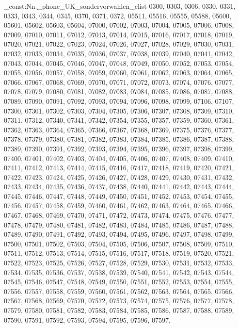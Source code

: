 \clist_const:Nn \c_phone_UK_sondervorwahlen_clist {0300,
0303,
0306,
0330,
0331,
0333,
0343,
0344,
0345,
0370,
0371,
0372,
05511,
05516,
05555,
05588,
05600,
05601,
05602,
05603,
05604,
07000,
07002,
07003,
07004,
07005,
07006,
07008,
07009,
07010,
07011,
07012,
07013,
07014,
07015,
07016,
07017,
07018,
07019,
07020,
07021,
07022,
07023,
07024,
07026,
07027,
07028,
07029,
07030,
07031,
07032,
07033,
07034,
07035,
07036,
07037,
07038,
07039,
07040,
07041,
07042,
07043,
07044,
07045,
07046,
07047,
07048,
07049,
07050,
07052,
07053,
07054,
07055,
07056,
07057,
07058,
07059,
07060,
07061,
07062,
07063,
07064,
07065,
07066,
07067,
07068,
07069,
07070,
07071,
07072,
07073,
07074,
07076,
07077,
07078,
07079,
07080,
07081,
07082,
07083,
07084,
07085,
07086,
07087,
07088,
07089,
07090,
07091,
07092,
07093,
07094,
07096,
07098,
07099,
07106,
07107,
07300,
07301,
07302,
07303,
07304,
07305,
07306,
07307,
07308,
07309,
07310,
07311,
07312,
07340,
07341,
07342,
07354,
07355,
07357,
07359,
07360,
07361,
07362,
07363,
07364,
07365,
07366,
07367,
07368,
07369,
07375,
07376,
07377,
07378,
07379,
07380,
07381,
07382,
07383,
07384,
07385,
07386,
07387,
07388,
07389,
07390,
07391,
07392,
07393,
07394,
07395,
07396,
07397,
07398,
07399,
07400,
07401,
07402,
07403,
07404,
07405,
07406,
07407,
07408,
07409,
07410,
07411,
07412,
07413,
07414,
07415,
07416,
07417,
07418,
07419,
07420,
07421,
07422,
07423,
07424,
07425,
07426,
07427,
07428,
07429,
07430,
07431,
07432,
07433,
07434,
07435,
07436,
07437,
07438,
07440,
07441,
07442,
07443,
07444,
07445,
07446,
07447,
07448,
07449,
07450,
07451,
07452,
07453,
07454,
07455,
07456,
07457,
07458,
07459,
07460,
07461,
07462,
07463,
07464,
07465,
07466,
07467,
07468,
07469,
07470,
07471,
07472,
07473,
07474,
07475,
07476,
07477,
07478,
07479,
07480,
07481,
07482,
07483,
07484,
07485,
07486,
07487,
07488,
07489,
07490,
07491,
07492,
07493,
07494,
07495,
07496,
07497,
07498,
07499,
07500,
07501,
07502,
07503,
07504,
07505,
07506,
07507,
07508,
07509,
07510,
07511,
07512,
07513,
07514,
07515,
07516,
07517,
07518,
07519,
07520,
07521,
07522,
07523,
07525,
07526,
07527,
07528,
07529,
07530,
07531,
07532,
07533,
07534,
07535,
07536,
07537,
07538,
07539,
07540,
07541,
07542,
07543,
07544,
07545,
07546,
07547,
07548,
07549,
07550,
07551,
07552,
07553,
07554,
07555,
07556,
07557,
07558,
07559,
07560,
07561,
07562,
07563,
07564,
07565,
07566,
07567,
07568,
07569,
07570,
07572,
07573,
07574,
07575,
07576,
07577,
07578,
07579,
07580,
07581,
07582,
07583,
07584,
07585,
07586,
07587,
07588,
07589,
07590,
07591,
07592,
07593,
07594,
07595,
07596,
07597,
}
